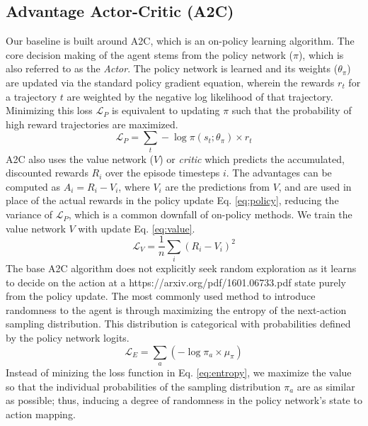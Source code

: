 \documentclass{article}
\begin{document}
\subsection{Advantage Actor-Critic (A2C)}
Our baseline is built around A2C, which is an on-policy learning algorithm. The core decision making of the agent stems from the policy network ($\pi$), which is also referred to as the \textit{Actor}. The policy network is learned and its weights ($\theta_\pi$) are updated via the standard policy gradient equation, wherein the rewards $r_t$ for a trajectory $t$ are weighted by the negative log likelihood of that trajectory. Minimizing this loss $\mathcal{L}_P$ is equivalent to updating $\pi$ such that the probability of high reward trajectories are maximized.
\begin{equation}
\mathcal{L}_{P} = \sum_{t} -\log\pi(s_t; \theta_\pi) \times r_t\label{eq:policy}
\end{equation}
A2C also uses the value network ($V$) or \textit{critic} which predicts the accumulated, discounted rewards $R_i$ over the episode timesteps $i$. The advantages can be computed as $A_i = R_i - V_i$, where $V_i$ are the predictions from $V$, and are used in place of the actual rewards in the policy update Eq. \ref{eq:policy}, reducing the variance of $\mathcal{L}_P$, which is a common downfall of on-policy methods. We train the value network $V$ with update Eq. \ref{eq:value}.
\begin{equation}
\mathcal{L}_V = \frac{1}{n}\sum_i (R_i - V_i)^2\label{eq:value}
\end{equation}
The base A2C algorithm does not explicitly seek random exploration as it learns to decide on the action at a https://arxiv.org/pdf/1601.06733.pdf state purely from the policy update. The most commonly used method to introduce randomness to the agent is through maximizing the entropy of the next-action sampling distribution. This distribution is categorical with probabilities defined by the policy network logits.
\begin{equation}\label{eq:entropy}
\mathcal{L}_E = \sum_a (-\log \pi_a \times \mu_\pi)
\end{equation}
Instead of minizing the loss function in Eq. \ref{eq:entropy}, we maximize the value so that the individual probabilities of the sampling distribution $\pi_a$ are as similar as possible; thus, inducing a degree of randomness in the policy network's state to action mapping.
\end{document}
